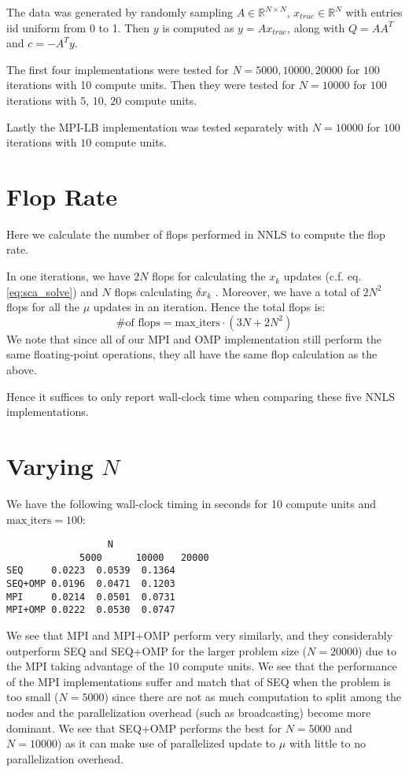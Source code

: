 \documentclass{article}
\begin{document}
The data was generated by randomly sampling $A \in \mathbb R^{N \times N}$, $x_{true} \in \mathbb R^N$ with entries iid uniform from 0 to 1. Then $y$ is computed as $y = Ax_{true}$, along with $Q = A A^T$ and $c = - A^T y$.

The first four implementations were tested for $N = 5000, 10000, 20000$ for $100$ iterations with 10 compute units. Then they were tested for $N = 10000$ for $100$ iterations with $5$, $10$, $20$ compute units.

Lastly the MPI-LB implementation was tested separately with $N = 10000$ for $100$ iterations with $10$ compute units.

\section*{Flop Rate}
Here we calculate the number of flops performed in NNLS to compute the flop rate.

In one iterations, we have $2N$ flops for calculating the $x_k$ updates (c.f. eq. \ref{eq:sca_solve}) and $N$ flops calculating $\delta x_k$ . Moreover, we have a total of $2N^2$ flops for all the $\mu$ updates in an iteration. Hence the total flops is:
\begin{equation}
    \text{\# of flops} = \text{max\_iters} \cdot (3N + 2N^2)
\end{equation}
We note that since all of our MPI and OMP implementation still perform the same floating-point operations, they all have the same flop calculation as the above.

Hence it suffices to only report wall-clock time when comparing these five NNLS implementations.

\section*{Varying $N$}
We have the following wall-clock timing in seconds for 10 compute units and $\text{max\_iters} = 100$:
\begin{verbatim}
                  N
	         5000	   10000   20000
SEQ     0.0223  0.0539  0.1364
SEQ+OMP 0.0196  0.0471  0.1203
MPI     0.0214  0.0501  0.0731
MPI+OMP 0.0222  0.0530  0.0747
\end{verbatim}

We see that MPI and MPI+OMP perform very similarly, and they considerably outperform SEQ and SEQ+OMP for the larger problem size ($N= 20000$) due to the MPI taking advantage of the 10 compute units. We see that the performance of the MPI implementations suffer and match that of SEQ when the problem is too small ($N=5000$) since there are not as much computation to split among the nodes and the parallelization overhead (such as broadcasting) become more dominant. We see that SEQ+OMP performs the best for $N = 5000$ and $N = 10000$) as it can make use of parallelized update to $\mu$ with little to no parallelization overhead.
\end{document}
